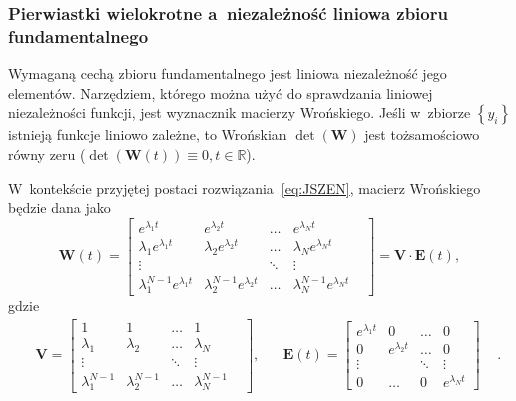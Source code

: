 \documentclass[paper=a4,DIV=12]{lpas}
\begin{document}
\subsubsection{Pierwiastki wielokrotne a~niezależność liniowa zbioru fundamentalnego}
\label{sec:XU35F}

Wymaganą cechą zbioru fundamentalnego jest liniowa niezależność jego elementów.
Narzędziem, którego można użyć do sprawdzania liniowej niezależności funkcji,
jest wyznacznik macierzy Wrońskiego. Jeśli w~zbiorze $\left\lbrace y_i
\right\rbrace$ istnieją funkcje liniowo zależne, to Wrońskian
$\det{\left(\mathbf{W}\right)}$ jest tożsamościowo równy zeru
($\det{\left(\mathbf{W}(t)\right)} \equiv 0, t \in \mathbb{R}$).

W~kontekście przyjętej postaci rozwiązania~\eqref{eq:JSZEN}, macierz
Wrońskiego będzie dana jako
\begin{equation}
  \mathbf{W}(t) = \begin{bmatrix}
    e^{\lambda_1 t}                 & e^{\lambda_2 t}                 & \dots   & e^{\lambda_N t} \\
    \lambda_1 e^{\lambda_1 t}       & \lambda_2 e^{\lambda_2 t}       & \dots   & \lambda_N e^{\lambda_N t} \\
    \vdots         &                & \ddots                          & \vdots  &       \\
    \lambda_1^{N-1} e^{\lambda_1 t} & \lambda_2^{N-1} e^{\lambda_2 t} & \dots   & \lambda_N^{N-1} e^{\lambda_N t}
  \end{bmatrix} = \mathbf{V} \cdot \mathbf{E}(t),
  \label{eq:SGIWG}
\end{equation}
gdzie
\begin{equation}
  \begin{aligned}
    & \mathbf{V} = \begin{bmatrix}
      1               & 1               & \dots   & 1           \\
      \lambda_1       & \lambda_2       & \dots   & \lambda_N   \\
      \vdots          &                 & \ddots  & \vdots  &   \\
      \lambda_1^{N-1} & \lambda_2^{N-1} & \dots   & \lambda_N^{N-1}
    \end{bmatrix},
    &
    &
    \mathbf{E}(t) = \begin{bmatrix}
      e^{\lambda_1 t} & 0               & \dots  & 0      \\
      0               & e^{\lambda_2 t} & \dots  & 0      \\
      \vdots          &                 & \ddots & \vdots \\
      0               & \dots           & 0      & e^{\lambda_N t}
    \end{bmatrix}
    &
  \end{aligned}.
  \label{eq:NHY93}
\end{equation}
\end{document}
